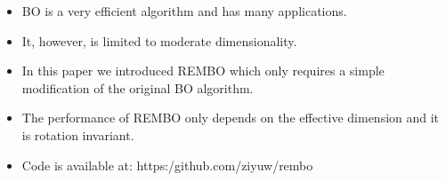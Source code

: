 \documentclass[final]{beamer}
\begin{document}
\begin{frame}[t]
\begin{columns}[T]
\begin{column}{.48\textwidth}
\begin{block}
 \begin{itemize}
   \item BO is a very efficient algorithm and has many applications.
   \item It, however, is limited to moderate dimensionality.
   \item In this paper we introduced REMBO which only requires a simple modification of the original BO algorithm.
   \item The performance of REMBO only depends on the effective dimension and it is rotation invariant.
   \item Code is available at: https:/github.com/ziyuw/rembo
  \end{itemize}
\end{block}


\end{column}
\end{columns}
\end{frame}
\end{document}
